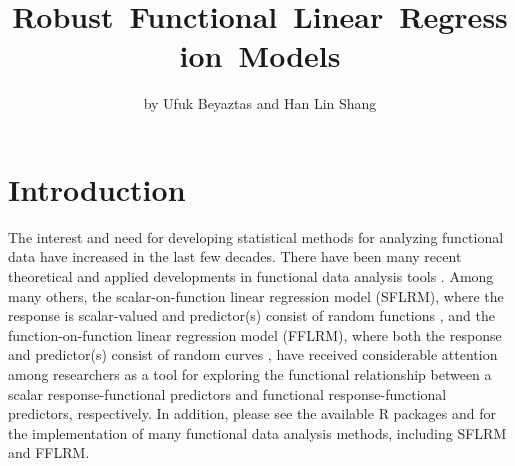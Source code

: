 \title{\mbox{Robust Functional Linear Regression Models}}
\author{by Ufuk Beyaztas and Han Lin Shang}

\maketitle


\section{Introduction}

The interest and need for developing statistical methods for analyzing functional data have increased in the last few decades. There have been many recent theoretical and applied developments in functional data analysis tools \citep[see][]{ramsay1991, ramsay2002, ramsay2006, ferraty2006, horvath2012, cuevas2014, Hsing, MRS15, SK16, DM16, KoRe}. Among many others, the scalar-on-function linear regression model (SFLRM), where the response is scalar-valued and predictor(s) consist of random functions \citep[see][]{cardot1991, cardot2003, james2002, ResiOgden, chen2011, jiang2011, GBC11, dou2012, TLS19, ATW20, BSchem}, and the function-on-function linear regression model (FFLRM), where both the response and predictor(s) consist of random curves \cite[see][]{yao2005, harezlak2007, senturk2008, matsui2009, ivanescu2015, SSG15, chiou2016, BeyaztasShang2020}, have received considerable attention among researchers as a tool for exploring the functional relationship between a scalar response-functional predictors and functional response-functional predictors, respectively. In addition, please see the available \textsf{R} packages  \citep{RGH22} and  \citep{GSH22} for the implementation of many functional data analysis methods, including SFLRM and FFLRM.


